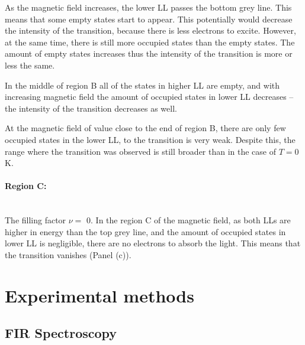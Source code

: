 \documentclass[titlepage,a4paper]{book}
\newcommand{\wciecie}{\quad\phantom{v}}
\newcommand{\myparagraph}[1]{\paragraph{#1}\mbox{}\\}
\begin{document}
As the magnetic field increases, the lower LL passes the bottom grey line. This means that some empty states start to appear. This potentially would decrease the intensity of the transition, because there is less electrons to excite. However, at the same time, there is still more occupied states than the empty states. The amount of empty states increases thus the intensity of the transition is more or less the same.

In the middle of region B all of the states in higher LL are empty, and with increasing magnetic field the amount of occupied states in lower LL decreases -- the intensity of the transition decreases as well.

At the magnetic field of value close to the end of region B, there are only few occupied states in the lower LL, to the transition is very weak. Despite this, the range where the transition was observed is still broader than in the case of $T = 0$ K.

\myparagraph{Region C:}
\wciecie
The filling factor $\nu =$ 0. In the region C of the magnetic field, as both LLs are higher in energy than the top grey line, and the amount of occupied states in lower LL is negligible, there are no electrons to absorb the light. This means that the transition vanishes (Panel (c)).


\section{Experimental methods}

\subsection{FIR Spectroscopy}
\wciecie

\end{document}
